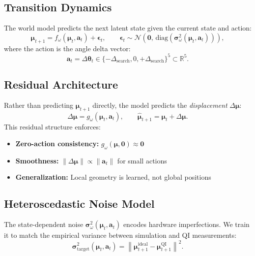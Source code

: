 \documentclass[11pt,a4paper]{article}
\begin{document}
\subsection{Transition Dynamics}

The world model predicts the next latent state given the current state and action:
\begin{equation}
    \boldsymbol{\mu}_{t+1} = f_\omega(\boldsymbol{\mu}_t, \mathbf{a}_t) + \boldsymbol{\epsilon}_t,
    \qquad
    \boldsymbol{\epsilon}_t \sim \mathcal{N}\!\left(\mathbf{0},\,
    \mathrm{diag}(\boldsymbol{\sigma}^2_\omega(\boldsymbol{\mu}_t, \mathbf{a}_t))\right),
\end{equation}
where the action is the angle delta vector:
\begin{equation}
    \mathbf{a}_t = \Delta\boldsymbol{\theta}_t \in
    \{-\Delta_{\mathrm{search}}, 0, +\Delta_{\mathrm{search}}\}^5 \subset \mathbb{R}^5.
\end{equation}

\subsection{Residual Architecture}

Rather than predicting $\boldsymbol{\mu}_{t+1}$ directly, the model predicts the
\emph{displacement} $\Delta\boldsymbol{\mu}$:
\begin{equation}
    \Delta\boldsymbol{\mu} = g_\omega(\boldsymbol{\mu}_t, \mathbf{a}_t),
    \qquad
    \hat{\boldsymbol{\mu}}_{t+1} = \boldsymbol{\mu}_t + \Delta\boldsymbol{\mu}.
\end{equation}
This residual structure enforces:
\begin{itemize}
    \item \textbf{Zero-action consistency:} $g_\omega(\boldsymbol{\mu}, \mathbf{0}) \approx \mathbf{0}$
    \item \textbf{Smoothness:} $\|\Delta\boldsymbol{\mu}\| \propto \|\mathbf{a}_t\|$ for small actions
    \item \textbf{Generalization:} Local geometry is learned, not global positions
\end{itemize}

\subsection{Heteroscedastic Noise Model}

The state-dependent noise $\boldsymbol{\sigma}^2_\omega(\boldsymbol{\mu}_t, \mathbf{a}_t)$
encodes hardware imperfections. We train it to match the empirical variance between
simulation and QI measurements:
\begin{equation}
    \boldsymbol{\sigma}^2_{\mathrm{target}}(\boldsymbol{\mu}_t, \mathbf{a}_t)
    = \left\|\boldsymbol{\mu}_{t+1}^{\mathrm{ideal}} - \boldsymbol{\mu}_{t+1}^{\mathrm{QI}}\right\|^2.
\end{equation}
\end{document}

